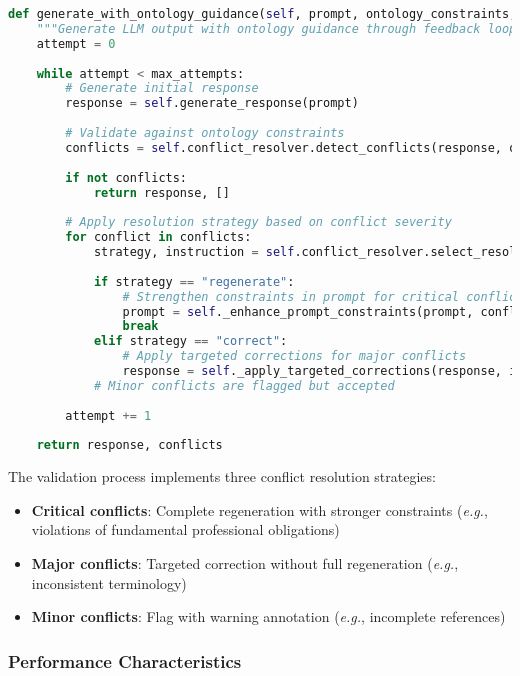 \begin{lstlisting}[language=Python, caption=Bidirectional Validation with Conflict Resolution]
def generate_with_ontology_guidance(self, prompt, ontology_constraints, max_attempts=3):
    """Generate LLM output with ontology guidance through feedback loop."""
    attempt = 0
    
    while attempt < max_attempts:
        # Generate initial response
        response = self.generate_response(prompt)
        
        # Validate against ontology constraints
        conflicts = self.conflict_resolver.detect_conflicts(response, ontology_constraints)
        
        if not conflicts:
            return response, []
        
        # Apply resolution strategy based on conflict severity
        for conflict in conflicts:
            strategy, instruction = self.conflict_resolver.select_resolution_strategy(conflict)
            
            if strategy == "regenerate":
                # Strengthen constraints in prompt for critical conflicts
                prompt = self._enhance_prompt_constraints(prompt, conflicts)
                break
            elif strategy == "correct":
                # Apply targeted corrections for major conflicts
                response = self._apply_targeted_corrections(response, instruction)
            # Minor conflicts are flagged but accepted
        
        attempt += 1
    
    return response, conflicts
\end{lstlisting}

The validation process implements three conflict resolution strategies:
\begin{itemize}
\item \textbf{Critical conflicts}: Complete regeneration with stronger constraints (\emph{e.g.}, violations of fundamental professional obligations)
\item \textbf{Major conflicts}: Targeted correction without full regeneration (\emph{e.g.}, inconsistent terminology)
\item \textbf{Minor conflicts}: Flag with warning annotation (\emph{e.g.}, incomplete references)
\end{itemize}

\subsubsection{Performance Characteristics}

